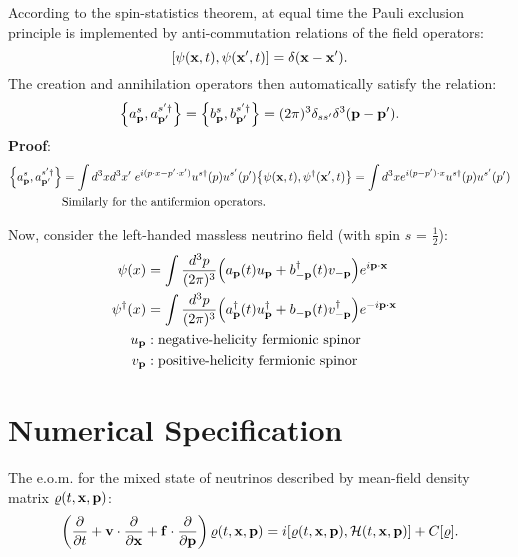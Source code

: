 \documentclass[11pt,a4paper]{article}
\begin{document}
    \noindent According to the spin-statistics theorem, at equal time the Pauli exclusion principle is implemented by anti-commutation relations of the field operators:
    \[
    \comm{\psi(\vb{x}, t)}{\psi(\vb{x}^{\prime}, t)} = \delta(\vb{x} - \vb{x}^{\prime}) .\] 
    \noindent The creation and annihilation operators then automatically satisfy the relation:
    \[
       \acomm{a_{\vb{p}}^{s}}{a_{\vb{p}^{\prime}}^{s^{\prime} \dagger}} = \acomm{b_{\vb{p}}^{s}}{b_{\vb{p}^{\prime}}^{s^{\prime}\dagger}} = (2\pi)^{3} \delta_{s s^{\prime}}\delta^{3}(\vb{p} - \vb{p}^{\prime}) 
 .\]
 \textbf{Proof}:
    \begin{align*}
       \acomm{a_{\vb{p}}^{s}}{a_{\vb{p}^{\prime}}^{s^{\prime} \dagger}} &= \int d^{3}x d^{3}x^{\prime} \hspace{0.1cm}e^{i(p \cdot x - p^{\prime}\cdot x^{\prime})} u^{s \dagger}(p) u^{s^{\prime}}(p^{\prime})\acomm{\psi (\vb{x}, t)}{\psi ^{\dagger}(\vb{x}^{\prime}, t)} = \int d^{3}x e^{i(p-p^{\prime}) \cdot x} u^{s \dagger}(p) u^{s^{\prime}}(p^{\prime}) \\
            &\text{Similarly for the antifermion operators.}
    \end{align*}

    \noindent Now, consider the left-handed massless neutrino field (with spin $s$ = $\frac{1}{2}$):
\begin{align*}
   \psi(x) &= \int \frac{d^{3}p}{(2\pi)^{3}}\Big(a_{\vb{p}}(t)u_{\vb{p}} + b^{\dagger}_{-\vb{p}}(t)v_{-\vb{p}}\Big)e^{i \vb{p} \cdot \vb{x}} \hspace{0.5cm}\\ 
   \psi ^{\dagger}(x) &= \int \frac{d^{3}p}{(2\pi)^{3}}\Big(a_{\vb{p}}^{\dagger}(t)u_{\vb{p}}^{\dagger} + b_{-\vb{p}}(t)v^{\dagger}_{-\vb{p}}\Big)e^{-i \vb{p} \cdot \vb{x}}\\
   u_{\vb{p}}&: \text{negative-helicity fermionic spinor}\\
   v_{\vb{p}}&: \text{positive-helicity fermionic spinor}
 \end{align*}






 \section{Numerical Specification}%
 \label{sec:Numerical Simulation}

 The e.o.m. for the mixed state of neutrinos described by mean-field density matrix $\varrho(t,\vb{x}, \vb{p})$:
 \[
 \left(  \frac{\partial}{\partial t} + \vb{v}\cdot \frac{\partial}{\partial \vb{x}} + \vb{f} \cdot \frac{\partial}{\partial \vb{p}}\right) \varrho(t,\vb{x}, \vb{p}) = i \comm{\varrho (t, \vb{x}, \vb{p})}{\mathcal{H}(t, \vb{x}, \vb{p})} + C[\varrho].\] 
\end{document}
